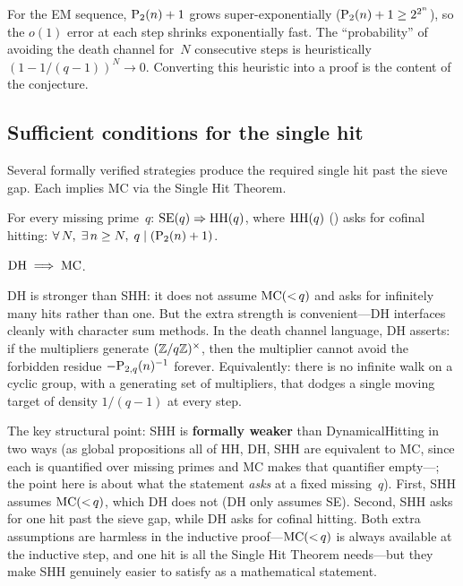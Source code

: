 For the EM sequence, $\mathrm{P}_{2}(n)+1$ grows super-exponentially
($\mathrm{P}_{2}(n)+1 \geq 2^{2^n}$), so the $o(1)$ error at each step
shrinks exponentially fast.  The ``probability'' of avoiding the death
channel for~$N$ consecutive steps is heuristically
$(1 - 1/(q-1))^N \to 0$.  Converting this heuristic into a proof is
the content of the conjecture.

\subsection{Sufficient conditions for the single hit}
\label{sec:sufficient-conditions}

Several formally verified strategies produce the required single hit
past the sieve gap.  Each implies MC via the Single Hit Theorem.

\begin{property}\label{def:dh}\label{def:hh}
For every missing prime~$q$: $\mathrm{SE}(q) \Rightarrow \mathrm{HH}(q)$, where
$\mathrm{HH}(q)$ () asks for cofinal hitting:
$\forall\, N,\; \exists\, n \geq N,\; q \mid (\mathrm{P}_{2}(n) + 1)$.
\end{property}

\begin{theorem}
\label{thm:dh-mc}
$\mathrm{DH} \;\Longrightarrow\; \mathrm{MC}$.
\end{theorem}

DH is stronger than SHH: it does not assume $\mathrm{MC}({<}\,q)$ and asks for
infinitely many hits rather than one.  But the extra strength is
convenient---DH interfaces cleanly with character sum methods.
In the death channel language, DH asserts: if the multipliers generate
$(\mathbb{Z}/q\mathbb{Z})^\times$, then the multiplier cannot avoid the forbidden
residue $-\mathrm{P}_{2,q}(n)^{-1}$ forever.  Equivalently: there is no
infinite walk on a cyclic group, with a generating set of multipliers,
that dodges a single moving target of density $1/(q-1)$ at every step.

The key structural point: SHH is \textbf{formally weaker} than
DynamicalHitting in two ways (as global propositions all of HH, DH, SHH
are equivalent to MC, since each is quantified over missing primes and MC
makes that quantifier empty---;
the point here is about what the statement \emph{asks} at a fixed
missing~$q$).
First, SHH assumes $\mathrm{MC}({<}\,q)$, which DH does not (DH only assumes SE).
Second, SHH asks for one hit past the sieve gap, while DH asks for
cofinal hitting.  Both extra assumptions are harmless in the inductive
proof---$\mathrm{MC}({<}\,q)$ is always available at the inductive step, and
one hit is all the Single Hit Theorem needs---but they make SHH
genuinely easier to satisfy as a mathematical statement.

